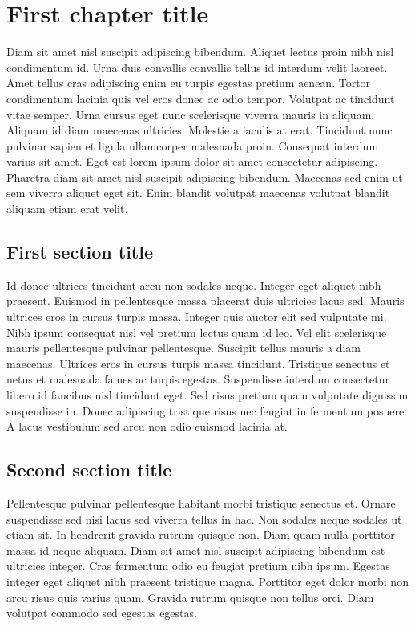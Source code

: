 \chapter{First chapter title}

Diam sit amet nisl suscipit adipiscing bibendum. Aliquet lectus proin nibh nisl condimentum id. Urna duis convallis convallis tellus 
id interdum velit laoreet. Amet tellus cras adipiscing enim eu turpis egestas pretium aenean. Tortor condimentum lacinia quis vel eros 
donec ac odio tempor. Volutpat ac tincidunt vitae semper. Urna cursus eget nunc scelerisque viverra mauris in aliquam. Aliquam id diam 
maecenas ultricies. Molestie a iaculis at erat. Tincidunt nunc pulvinar sapien et ligula ullamcorper malesuada proin. Consequat interdum 
varius sit amet. Eget est lorem ipsum dolor sit amet consectetur adipiscing. Pharetra diam sit amet nisl suscipit adipiscing bibendum. 
Maecenas sed enim ut sem viverra aliquet eget sit. Enim blandit volutpat maecenas volutpat blandit aliquam etiam erat velit.

\section{First section title}

Id donec ultrices tincidunt arcu non sodales neque. Integer eget aliquet nibh praesent. Euismod in pellentesque massa placerat duis 
ultricies lacus sed. Mauris ultrices eros in cursus turpis massa. Integer quis auctor elit sed vulputate mi. Nibh ipsum consequat nisl 
vel pretium lectus quam id leo. Vel elit scelerisque mauris pellentesque pulvinar pellentesque. Suscipit tellus mauris a diam maecenas. 
Ultrices eros in cursus turpis massa tincidunt. Tristique senectus et netus et malesuada fames ac turpis egestas. Suspendisse interdum 
consectetur libero id faucibus nisl tincidunt eget. Sed risus pretium quam vulputate dignissim suspendisse in. Donec adipiscing tristique 
risus nec feugiat in fermentum posuere. A lacus vestibulum sed arcu non odio euismod lacinia at.

\section{Second section title}

Pellentesque pulvinar pellentesque habitant morbi tristique senectus et. Ornare suspendisse sed nisi lacus sed viverra tellus in hac. 
Non sodales neque sodales ut etiam sit. In hendrerit gravida rutrum quisque non. Diam quam nulla porttitor massa id neque aliquam. Diam 
sit amet nisl suscipit adipiscing bibendum est ultricies integer. Cras fermentum odio eu feugiat pretium nibh ipsum. Egestas integer eget 
aliquet nibh praesent tristique magna. Porttitor eget dolor morbi non arcu risus quis varius quam. Gravida rutrum quisque non tellus orci. 
Diam volutpat commodo sed egestas egestas.